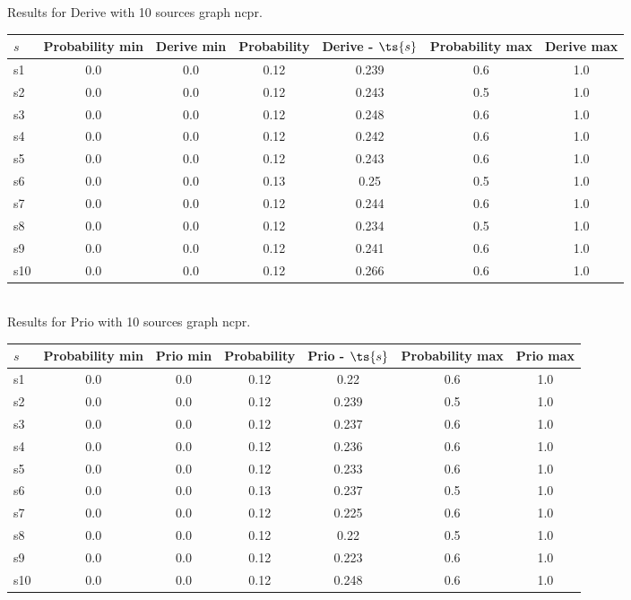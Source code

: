 \documentclass{article}
\begin{document}
\noindent Results for Derive with 10 sources graph ncpr.

\noindent\begin{tabular}{|l|c|c|c|c|c|c|}
\hline
$s$& Probability min & Derive min & Probability & Derive - $\ts{s}$ & Probability max & Derive max\\
\hline
s1 &0.0 & 0.0 & 0.12 & 0.239 & 0.6 & 1.0\\
\hline
s2 &0.0 & 0.0 & 0.12 & 0.243 & 0.5 & 1.0\\
\hline
s3 &0.0 & 0.0 & 0.12 & 0.248 & 0.6 & 1.0\\
\hline
s4 &0.0 & 0.0 & 0.12 & 0.242 & 0.6 & 1.0\\
\hline
s5 &0.0 & 0.0 & 0.12 & 0.243 & 0.6 & 1.0\\
\hline
s6 &0.0 & 0.0 & 0.13 & 0.25 & 0.5 & 1.0\\
\hline
s7 &0.0 & 0.0 & 0.12 & 0.244 & 0.6 & 1.0\\
\hline
s8 &0.0 & 0.0 & 0.12 & 0.234 & 0.5 & 1.0\\
\hline
s9 &0.0 & 0.0 & 0.12 & 0.241 & 0.6 & 1.0\\
\hline
s10 &0.0 & 0.0 & 0.12 & 0.266 & 0.6 & 1.0\\
\hline
\end{tabular}\\

\noindent Results for Prio with 10 sources graph ncpr.

\noindent\begin{tabular}{|l|c|c|c|c|c|c|}
\hline
$s$& Probability min & Prio min & Probability & Prio - $\ts{s}$ & Probability max & Prio max\\
\hline
s1 &0.0 & 0.0 & 0.12 & 0.22 & 0.6 & 1.0\\
\hline
s2 &0.0 & 0.0 & 0.12 & 0.239 & 0.5 & 1.0\\
\hline
s3 &0.0 & 0.0 & 0.12 & 0.237 & 0.6 & 1.0\\
\hline
s4 &0.0 & 0.0 & 0.12 & 0.236 & 0.6 & 1.0\\
\hline
s5 &0.0 & 0.0 & 0.12 & 0.233 & 0.6 & 1.0\\
\hline
s6 &0.0 & 0.0 & 0.13 & 0.237 & 0.5 & 1.0\\
\hline
s7 &0.0 & 0.0 & 0.12 & 0.225 & 0.6 & 1.0\\
\hline
s8 &0.0 & 0.0 & 0.12 & 0.22 & 0.5 & 1.0\\
\hline
s9 &0.0 & 0.0 & 0.12 & 0.223 & 0.6 & 1.0\\
\hline
s10 &0.0 & 0.0 & 0.12 & 0.248 & 0.6 & 1.0\\
\hline
\end{tabular}\\
\end{document}
